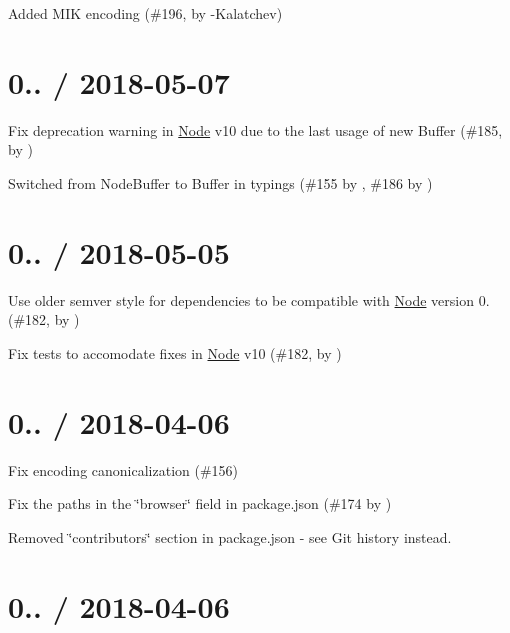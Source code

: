 
\begin{DoxyItemize}
\item Added M\+IK encoding (\#196, by -\/\+Kalatchev)
\end{DoxyItemize}

\section*{0.. / 2018-\/05-\/07}


\begin{DoxyItemize}
\item Fix deprecation warning in \mbox{\hyperlink{classNode}{Node}} v10 due to the last usage of {\ttfamily new Buffer} (\#185, by )
\item Switched from Node\+Buffer to Buffer in typings (\#155 by , \#186 by )
\end{DoxyItemize}

\section*{0.. / 2018-\/05-\/05}


\begin{DoxyItemize}
\item Use older semver style for dependencies to be compatible with \mbox{\hyperlink{classNode}{Node}} version 0. (\#182, by )
\item Fix tests to accomodate fixes in \mbox{\hyperlink{classNode}{Node}} v10 (\#182, by )
\end{DoxyItemize}

\section*{0.. / 2018-\/04-\/06}


\begin{DoxyItemize}
\item Fix encoding canonicalization (\#156)
\item Fix the paths in the \char`\"{}browser\char`\"{} field in package.\+json (\#174 by )
\item Removed \char`\"{}contributors\char`\"{} section in package.\+json -\/ see Git history instead.
\end{DoxyItemize}

\section*{0.. / 2018-\/04-\/06}


